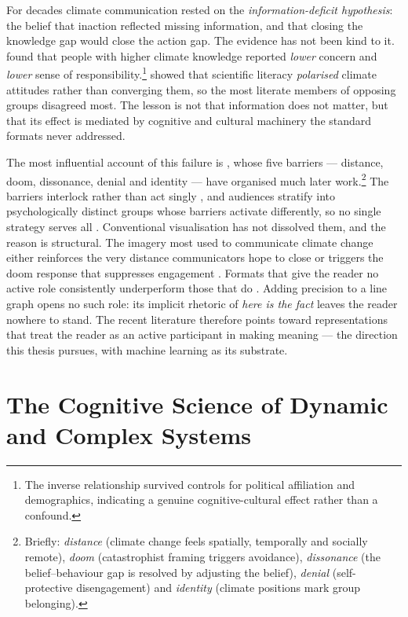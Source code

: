 For decades climate communication rested on the \emph{information-deficit hypothesis}: the belief that inaction reflected missing information, and that closing the knowledge gap would close the action gap. The evidence has not been kind to it. \citet{kellstedt2008} found that people with higher climate knowledge reported \emph{lower} concern and \emph{lower} sense of responsibility.\footnote{The inverse relationship survived controls for political affiliation and demographics, indicating a genuine cognitive-cultural effect rather than a confound.} \citet{kahan2015} showed that scientific literacy \emph{polarised} climate attitudes rather than converging them, so the most literate members of opposing groups disagreed most. The lesson is not that information does not matter, but that its effect is mediated by cognitive and cultural machinery the standard formats never addressed.
 
The most influential account of this failure is \citet{stoknes2015}, whose five barriers --- distance, doom, dissonance, denial and identity --- have organised much later work.\footnote{Briefly: \emph{distance} (climate change feels spatially, temporally and socially remote), \emph{doom} (catastrophist framing triggers avoidance), \emph{dissonance} (the belief--behaviour gap is resolved by adjusting the belief), \emph{denial} (self-protective disengagement) and \emph{identity} (climate positions mark group belonging).} The barriers interlock rather than act singly \citep{vanderlinden2015}, and audiences stratify into psychologically distinct groups whose barriers activate differently, so no single strategy serves all \citep{leiserowitz2021}. Conventional visualisation has not dissolved them, and the reason is structural. The imagery most used to communicate climate change either reinforces the very distance communicators hope to close or triggers the doom response that suppresses engagement \citep{cornerclimate2015, nicholsoncole2005}. Formats that give the reader no active role consistently underperform those that do \citep{ojala2023}. Adding precision to a line graph opens no such role: its implicit rhetoric of \emph{here is the fact} leaves the reader nowhere to stand. The recent literature therefore points toward representations that treat the reader as an active participant in making meaning \citep{marlon2019, morris2019} --- the direction this thesis pursues, with machine learning as its substrate.

\section{The Cognitive Science of Dynamic and Complex Systems}
\label{sec:cognitive-science}

